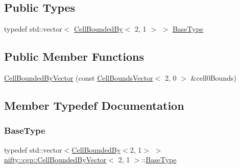 \subsection*{Public Types}
\begin{DoxyCompactItemize}
\item 
typedef std\+::vector$<$ \hyperlink{classnifty_1_1cgp_1_1CellBoundedBy}{Cell\+Bounded\+By}$<$ 2, 1 $>$ $>$ \hyperlink{classnifty_1_1cgp_1_1CellBoundedByVector_3_012_00_011_01_4_ae67b7b5bea502cf53791b047577eff16}{Base\+Type}
\end{DoxyCompactItemize}
\subsection*{Public Member Functions}
\begin{DoxyCompactItemize}
\item 
\hyperlink{classnifty_1_1cgp_1_1CellBoundedByVector_3_012_00_011_01_4_a234e9640290d247f90261787b95fcc90}{Cell\+Bounded\+By\+Vector} (const \hyperlink{classnifty_1_1cgp_1_1CellBoundsVector}{Cell\+Bounds\+Vector}$<$ 2, 0 $>$ \&cell0\+Bounds)
\end{DoxyCompactItemize}


\subsection{Member Typedef Documentation}
\mbox{\label{classnifty_1_1cgp_1_1CellBoundedByVector_3_012_00_011_01_4_ae67b7b5bea502cf53791b047577eff16}} 
\subsubsection{\texorpdfstring{Base\+Type}{BaseType}}
{\footnotesize\ttfamily typedef std\+::vector$<$\hyperlink{classnifty_1_1cgp_1_1CellBoundedBy}{Cell\+Bounded\+By}$<$2, 1$>$ $>$ \hyperlink{classnifty_1_1cgp_1_1CellBoundedByVector}{nifty\+::cgp\+::\+Cell\+Bounded\+By\+Vector}$<$ 2, 1 $>$\+::\hyperlink{classnifty_1_1cgp_1_1CellBoundedByVector_3_012_00_011_01_4_ae67b7b5bea502cf53791b047577eff16}{Base\+Type}}



